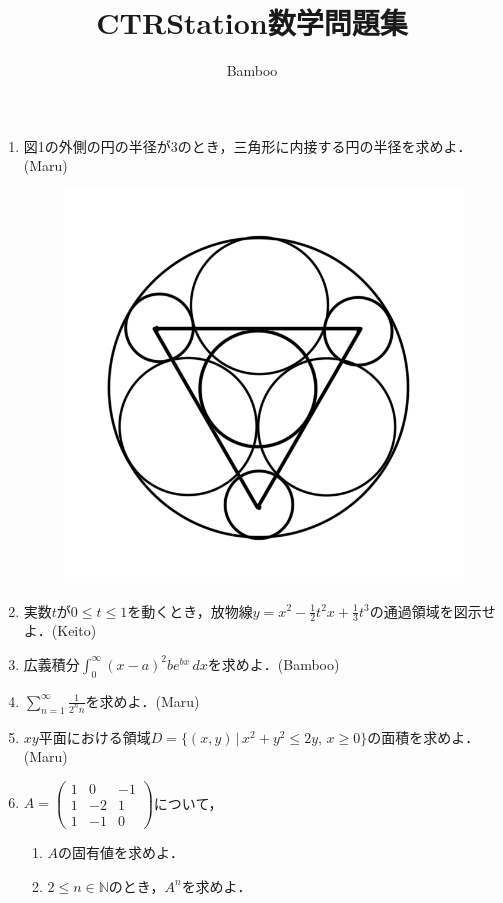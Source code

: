\documentclass[a4j]{jsarticle}
\title{CTRStation数学問題集}
\author{Bamboo}
\begin{document}
\maketitle

\begin{enumerate}
  \setlength{\parskip}{4cm}
  \everymath{\displaystyle}

  \item 図1の外側の円の半径が3のとき，三角形に内接する円の半径を求めよ．(Maru)

  \begin{figure}[htbp]
  \centering
  \includegraphics[scale=0.3]{radius.png}
  \caption{}
  \end{figure}

  \item 実数$t$が$0\le t\le1$を動くとき，放物線$y=x^2-\frac{1}{2}t^2x+\frac{1}{3}t^3$の通過領域を図示せよ．(Keito)
  \item 広義積分$\int_{0}^{∞}(x-a)^2be^{bx}\,dx$を求めよ．(Bamboo)
  \item $\sum_{n=1}^\infty \frac{1}{2^nn}$を求めよ．(Maru)
  \item $xy$平面における領域$D=\{(x,y)\,|\,x^2+y^2\le2y,\,x\ge0\}$の面積を求めよ．(Maru)
  \item $A=\begin{pmatrix}
    1 & 0 & -1 \\
    1 & -2 & 1 \\
    1 & -1 & 0
  \end{pmatrix}$について，
  \setlength{\parskip}{1.8cm}
  \begin{enumerate}
    \setlength{\parskip}{4cm}
    \item $A$の固有値を求めよ．
    \item $2\le n\in \mathbb{N}$のとき，$A^n$を求めよ．
  \end{enumerate}
  \setlength{\parskip}{4cm}

\end{enumerate}
\end{document}
